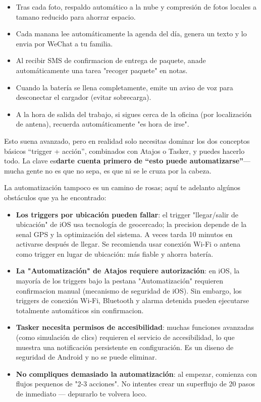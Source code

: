 \begin{itemize}
  \item Tras cada foto, respaldo automático a la nube y compresión de fotos locales a tamano reducido para ahorrar espacio.
  \item Cada manana lee automáticamente la agenda del día, genera un texto y lo envia por WeChat a tu familia.
  \item Al recibir SMS de confirmacion de entrega de paquete, anade automáticamente una tarea "recoger paquete" en notas.
  \item Cuando la batería se llena completamente, emite un aviso de voz para desconectar el cargador (evitar sobrecarga).
  \item A la hora de salida del trabajo, si sigues cerca de la oficina (por localización de antena), recuerda automáticamente "es hora de irse".
\end{itemize}

Esto suena avanzado, pero en realidad solo necesitas dominar los dos conceptos básicos “trigger + acción”, combinados con Atajos o Tasker, y puedes hacerlo todo. La clave es\textbf{darte cuenta primero de “esto puede automatizarse”}— mucha gente no es que no sepa, es que ni se le cruza por la cabeza.


La automatización tampoco es un camino de rosas; aquí te adelanto algúnos obstáculos que ya he encontrado:

\begin{itemize}
  \item \textbf{Los triggers por ubicación pueden fallar}: el trigger "llegar/salir de ubicación" de iOS usa tecnología de geocercado; la precision depende de la senal GPS y la optimización del sistema. A veces tarda 10 minutos en activarse después de llegar. Se recomienda usar conexión Wi-Fi o antena como trigger en lugar de ubicación: más fiable y ahorra batería.
  \item \textbf{La "Automatización" de Atajos requiere autorización}: en iOS, la mayoría de los triggers bajo la pestana "Automatización" requieren confirmacion manual (mecanismo de seguridad de iOS). Sin embargo, los triggers de conexión Wi-Fi, Bluetooth y alarma detenida pueden ejecutarse totalmente automáticos sin confirmacion.
  \item \textbf{Tasker necesita permisos de accesibilidad}: muchas funciones avanzadas (como simulación de clics) requieren el servicio de accesibilidad, lo que muestra una notificación persistente en configuración. Es un diseno de seguridad de Android y no se puede eliminar.
  \item \textbf{No compliques demasiado la automatización}: al empezar, comienza con flujos pequenos de "2-3 acciones". No intentes crear un superflujo de 20 pasos de inmediato — depurarlo te volvera loco.
\end{itemize}

